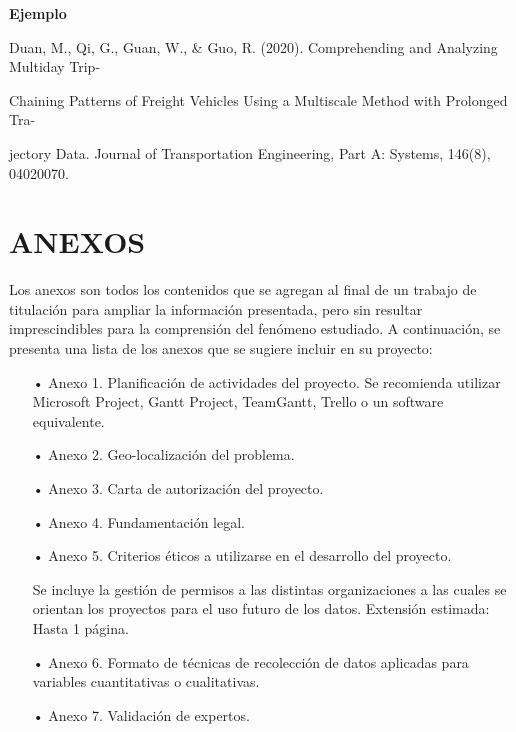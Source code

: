 \documentclass[12pt, a4paper, nofontenc, numbers=endperiod]{apa7}
\begin{document}
{\begin{center}
	\textbf{Ejemplo}
\end{center}	


\setlength{\parindent}{0cm}Duan, M., Qi, G., Guan, W., \& Guo, R. (2020). Comprehending and Analyzing Multiday Trip-

\setlength{\parindent}{1.10cm}Chaining Patterns of Freight Vehicles Using a Multiscale Method with Prolonged Tra-

\setlength{\parindent}{1.10cm}jectory Data. Journal of Transportation Engineering, Part A: Systems, 146(8), 04020070.

\newpage
\section*{\large\centering ANEXOS}
\setlength{\parindent}{1.27cm}Los anexos son todos los contenidos que se agregan al final de un trabajo de titulación para ampliar la información presentada, pero sin resultar imprescindibles para la comprensión del fenómeno estudiado. A continuación, se presenta una lista de los anexos que se sugiere incluir en su proyecto:

\begin{itemize}[leftmargin=1.70cm]
	\item[•]  Anexo 1. Planificación de actividades del proyecto. Se recomienda utilizar Microsoft Project, Gantt Project, TeamGantt, Trello o un software equivalente.
	
	\item[•]  Anexo 2. Geo-localización del problema.
	
	\item[•]  Anexo 3. Carta de autorización del proyecto.
	
	\item[•]  Anexo 4. Fundamentación legal.
	
	\item[•] Anexo 5. Criterios éticos a utilizarse en el desarrollo del proyecto.
	
	\setlength{\parindent}{1.27cm} Se incluye la gestión de permisos a las distintas organizaciones a las cuales se orientan los proyectos para el uso futuro de los datos. Extensión estimada: Hasta 1 página.
	
	
	\item[•] 	Anexo 6. Formato de técnicas de recolección de datos aplicadas para variables cuantitativas o cualitativas.
	
	\item[•] 	Anexo 7. Validación de expertos.
	

\end{itemize}}
\end{document}
